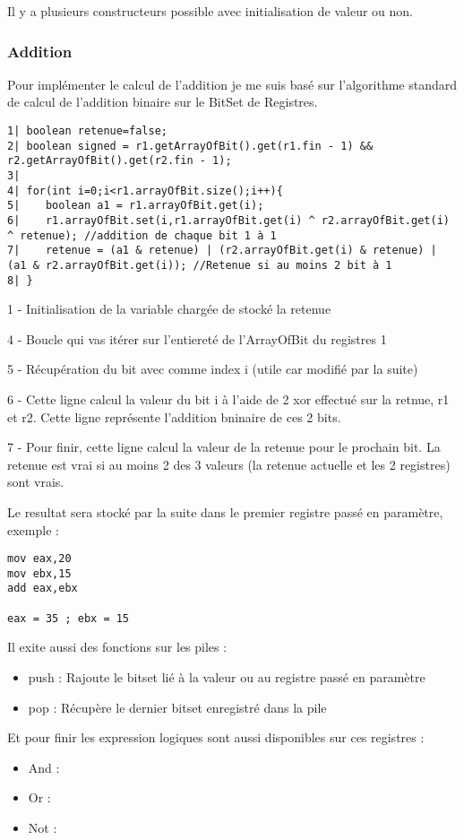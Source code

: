 \documentclass{article}
\begin{document}
Il y a plusieurs constructeurs possible avec initialisation de valeur ou non.

\subsubsection{Addition}
Pour implémenter le calcul de l'addition je me suis basé sur l'algorithme standard de calcul de l'addition binaire sur le BitSet de Registres.

\begin{verbatim}
1| boolean retenue=false;
2| boolean signed = r1.getArrayOfBit().get(r1.fin - 1) && r2.getArrayOfBit().get(r2.fin - 1);
3|
4| for(int i=0;i<r1.arrayOfBit.size();i++){
5|    boolean a1 = r1.arrayOfBit.get(i);
6|    r1.arrayOfBit.set(i,r1.arrayOfBit.get(i) ^ r2.arrayOfBit.get(i) ^ retenue); //addition de chaque bit 1 à 1
7|    retenue = (a1 & retenue) | (r2.arrayOfBit.get(i) & retenue) | (a1 & r2.arrayOfBit.get(i)); //Retenue si au moins 2 bit à 1
8| }
\end{verbatim}

1 - Initialisation de la variable chargée de stocké la retenue

4 - Boucle qui vas itérer sur l'entiereté de l'ArrayOfBit du registres 1

5 - Récupération du bit avec comme index i (utile car modifié par la suite)

6 - Cette ligne calcul la valeur du bit i à l'aide de 2 xor effectué sur la retnue, r1 et r2. Cette ligne représente l'addition bninaire de ces 2 bits.

7 - Pour finir, cette ligne calcul la valeur de la retenue pour le prochain bit. La retenue est vrai si au moins 2 des 3 valeurs (la retenue actuelle et les 2 registres) sont vrais.

Le resultat sera stocké par la suite dans le premier registre passé en paramètre, exemple :
\begin{verbatim}
mov eax,20
mov ebx,15
add eax,ebx

eax = 35 ; ebx = 15
\end{verbatim}

Il exite aussi des fonctions sur les piles :
\begin{itemize}
    \item push : Rajoute le bitset lié à la valeur ou au registre passé en paramètre
    \item pop : Récupère le dernier bitset enregistré dans la pile
\end{itemize}
Et pour finir les expression logiques sont aussi disponibles sur ces registres :
\begin{itemize}
    \item And :
    \item Or :
    \item Not :
\end{itemize}
\end{document}
